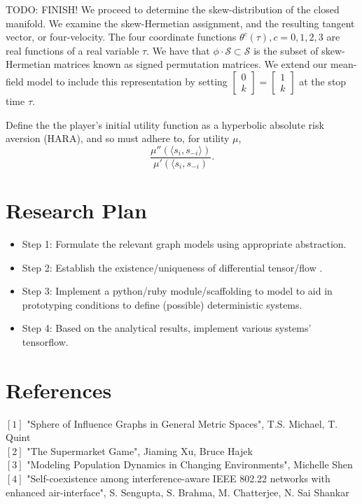 \documentclass[10pt]{article}
\newcommand{\mcS}{\mathcal{S}}
\theoremstyle{definition}
\begin{document}
TODO: FINISH!
We proceed to determine the skew-distribution of the closed manifold. 
We examine the skew-Hermetian assignment, and the resulting tangent vector, or four-velocity. 
The four coordinate functions $\theta^c (\tau), c = 0, 1, 2, 3$ are real
functions of a real variable $\tau$. 
We have that $\phi\cdot \mcS\subset \mcS$ is the subset of skew-Hermetian matrices known as signed
permutation matrices. We extend our mean-field model to include this
representation by setting $\begin{bmatrix}0 \\ k\end{bmatrix} = \begin{bmatrix}1
\\ k\end{bmatrix}$ at the stop time $\tau$. 

Define the the player's initial utility
function as a hyperbolic absolute risk aversion (HARA), and so must adhere to,
for utility $\mu$,
$$
    \displaystyle\frac{\mu''(\langle s_i,s_{-i}\rangle)}{\mu'(\langle s_i,
    s_{-i})}.
$$

\section{Research Plan}

\begin{itemize}
	\item Step 1: Formulate the relevant graph models using appropriate abstraction.
	\item Step 2: Establish the existence/uniqueness of differential tensor/flow .
	\item Step 3: Implement a python/ruby module/scaffolding to model to aid in prototyping
    conditions to define (possible) deterministic systems. 
	\item Step 4: Based on the analytical results, implement various systems' tensorflow.
\end{itemize}

\section{References}

$[1]$ "Sphere of Influence Graphs in General Metric Spaces", T.S. Michael, T. Quint\\
$[2]$ "The Supermarket Game", Jiaming Xu, Bruce Hajek\\
$[3]$ "Modeling Population Dynamics in Changing Environments", Michelle Shen\\
$[4]$ "Self-coexistence among interference-aware IEEE 802.22 networks with enhanced air-interface", S. Sengupta, S. Brahma, M. Chatterjee, N. Sai Shankar\\
\end{document}
